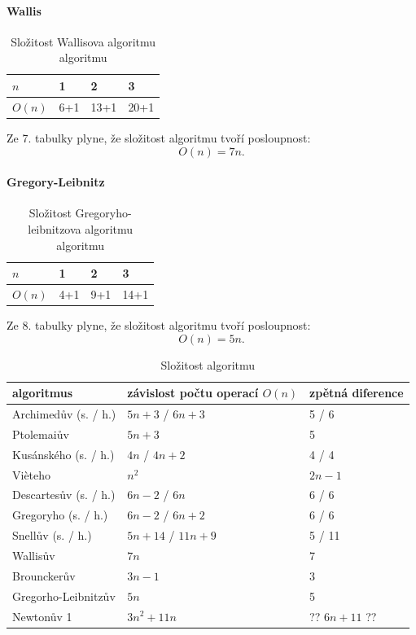 \documentclass[rocnikovka]{gzwroc} %
\begin{document}
\paragraph{Wallis}
\begin{table}[h!]
\caption{Složitost Wallisova algoritmu algoritmu}
\begin{tabular}{|l||l|l|l|}
\hline
$n$ & 1&2&3 \\ \hline
$O(n)$&6+1&13+1&20+1 \\ \hline
\end{tabular}
\end{table}
Ze 7. tabulky plyne, že složitost algoritmu tvoří posloupnost:
$$
O(n)=7n.
$$
\paragraph{Gregory-Leibnitz}
\begin{table}[h!]
\caption{Složitost Gregoryho-leibnitzova algoritmu algoritmu}
\begin{tabular}{|l||l|l|l|}
\hline
$n$ & 1&2&3 \\ \hline
$O(n)$&4+1&9+1&14+1 \\ \hline
\end{tabular}
\end{table}
Ze 8. tabulky plyne, že složitost algoritmu tvoří posloupnost:
$$
O(n)=5n.
$$
\begin{table}[h!]
\caption{Složitost algoritmu}
\begin{tabular}{|l||l|l|}
\hline
\bfseries{algoritmus} & \bfseries{závislost počtu operací $O(n)$} & \bfseries{zpětná diference} \\ \hline \hline
Archimedův (s. / h.) & $5n+3$ / $6n+3$      & 5 / 6   \\ \hline
Ptolemaiův & $5n+3$      & 5   \\ \hline
Kusánského (s. / h.) & $4n$ / $4n+2$      & 4 / 4   \\ \hline  
Vièteho & $n^2$      & $2n-1$   \\ \hline
Descartesův (s. / h.) & $6n-2$ / $6n$      & 6 / 6   \\ \hline
Gregoryho (s. / h.) & $6n-2$ / $6n+2$      & 6 / 6   \\ \hline
Snellův (s. / h.) & $5n+14$ / $11n+9$      & 5 / 11   \\ \hline
Wallisův & $7n$    & 7   \\ \hline
Brounckerův & $3n-1$    & 3   \\ \hline
Gregorho-Leibnitzův & $5n$      & 5  \\ \hline
Newtonův 1 & $3n^2+11n$      & ?? $6n+11$ ??  \\ \hline
\end{tabular}
\end{table}
\end{document}

